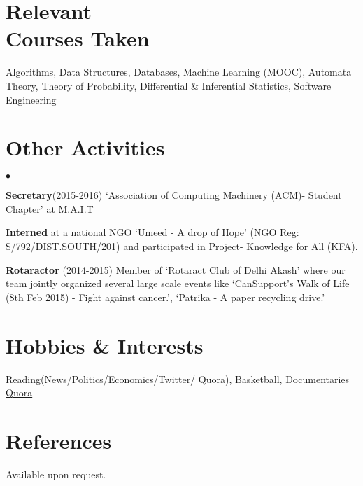 \documentclass[margin,line]{res}
\newenvironment{list2}{
  \begin{list}{$\bullet$}{%
      \setlength{\itemsep}{0in}
      \setlength{\parsep}{0in} \setlength{\parskip}{0in}
      \setlength{\topsep}{0in} \setlength{\partopsep}{0in}
      \setlength{\leftmargin}{0.2in}}}{\end{list}}
\begin{document}
\begin{resume}
\section{\sc Relevant \\Courses Taken}
Algorithms, Data Structures, Databases, Machine Learning (MOOC), Automata Theory, Theory of Probability, Differential \& Inferential Statistics, Software Engineering
\section{\sc Other Activities}
\begin{list2}
\item {\bf Secretary}(2015-2016)  `Association of Computing Machinery (ACM)- Student Chapter' at M.A.I.T
\item {\bf Interned} at a national NGO `Umeed - A drop of Hope' (NGO Reg: S/792/DIST.SOUTH/201) and participated in Project- Knowledge for All (KFA).
\item {\bf Rotaractor} (2014-2015) Member of `Rotaract Club of Delhi Akash' where our team jointly organized several large scale events like `CanSupport's Walk of Life (8th Feb 2015) - Fight against cancer.', 
`Patrika - A paper recycling drive.'
\end{list2}
\section{\sc Hobbies \& Interests}
Reading(News/Politics/Economics/Twitter/{\href{https://www.quora.com/profile/Somin-Wadhwa}{\color{blue} Quora}}), Basketball, Documentaries{\href{https://www.quora.com/profile/Somin-Wadhwa}{\color{blue} Quora}}
\section{\sc References }
Available upon request.
\end{resume}
\end{document}

